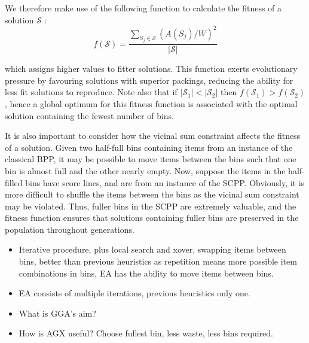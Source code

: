 \documentclass[authoryear]{elsarticle}
\begin{document}
We therefore make use of the following function to calculate the fitness of a solution $\mathcal{S}$ \citep{falkenauer1992}:
\begin{equation}
	f(\mathcal{S}) = \frac{\sum_{S_j \in \mathcal{S}} (A(S_j)/W)^2}{|\mathcal{S}|}
\end{equation}

\noindent which assigns higher values to fitter solutions. This function exerts evolutionary pressure by favouring solutions with superior packings, reducing the ability for less fit solutions to reproduce. Note also that if $|\mathcal{S}_1| < |\mathcal{S}_2|$  then $f(\mathcal{S}_1) > f(\mathcal{S}_2)$, hence a global optimum for this fitness function is associated with the optimal solution containing the fewest number of bins.

It is also important to consider how the vicinal sum constraint affects the fitness of a solution. Given two half-full bins containing items from an instance of the classical BPP, it may be possible to move items between the bins such that one bin is almost full and the other nearly empty. Now, suppose the items in the half-filled bins have score lines, and are from an instance of the SCPP. Obviously, it is more difficult to shuffle the items between the bins as the vicinal sum constraint may be violated. Thus, fuller bins in the SCPP are extremely valuable, and the fitness function ensures that solutions containing fuller bins are preserved in the population throughout generations.

{\color{myRed}
\begin{itemize}[leftmargin=*]
	\item Iterative procedure, plus local search and xover, swapping items between bins, better than previous heuristics as repetition means more possible item combinations in bins, EA has the ability to move items between bins.
	\item EA consists of multiple iterations, previous heuristics only one.
	\item What is GGA's aim?
	\item How is AGX useful? Choose fullest bin, less waste, less bins required.
\end{itemize}
}
\end{document}

